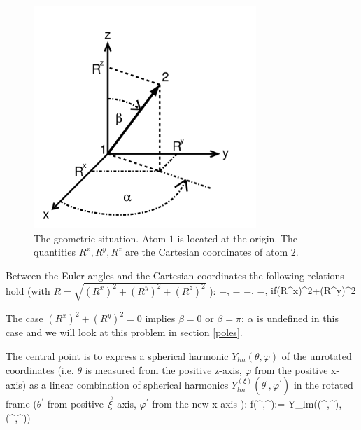\begin{figure}[t]
\begin{center}
\includegraphics[width=0.75\textwidth]{figures/Abbildung1}
\end{center}
\caption[The geometric situation]{The geometric situation. Atom $1$ is located at the origin.
The quantities $R^{x},R^{y},R^{z}$ are the Cartesian coordinates of atom $2$.}
\label{geometry}
\end{figure}
\par{Between the Euler angles and the Cartesian coordinates the following relations hold
(with $R=\sqrt{(R^x)^2+(R^y)^2+(R^z)^2}$ ):}
\be
\cos \beta=,\qquad
\sin \beta=
\ee
\be
\cos \alpha=,\quad
\sin \alpha=,\quad
if\quad (R^x)^2+(R^y)^2
\ee
\par{The case \((R^x)^2+(R^y)^2=0\) implies $\beta=0$ or $\beta=\pi$; $\alpha$ is undefined in this case and
we will look at this problem in section \ref{poles}. }
\par{The central point is to express a spherical harmonic \(Y_{lm}(\theta,\varphi)\) of
the unrotated coordinates (i.e. $\theta$ is measured from the positive z-axis,
 $\varphi$ from the positive x-axis) as a linear combination of spherical harmonics
$Y^{(\xi)}_{lm}(\theta^{\prime},\varphi^{\prime})$ in the rotated frame
($\theta^{\prime}$ from positive $\vec{\xi}$-axis, $\varphi^{\prime}$ from
the new x-axis ):}
\be
\label{RotCoor}
f(\theta^{\prime},\varphi^{\prime}):= Y_{lm}(\theta(\theta^{\prime},\varphi^{\prime}),\varphi(\theta^{\prime},\varphi^{\prime}))
